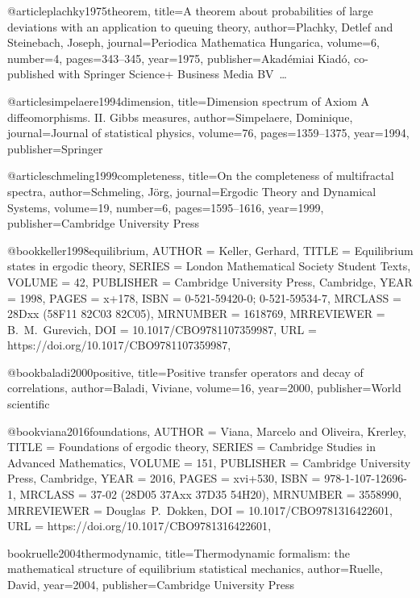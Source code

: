 @article{plachky1975theorem,
  title={A theorem about probabilities of large deviations with an application to queuing theory},
  author={Plachky, Detlef and Steinebach, Joseph},
  journal={Periodica Mathematica Hungarica},
  volume={6},
  number={4},
  pages={343--345},
  year={1975},
  publisher={Akad{\'e}miai Kiad{\'o}, co-published with Springer Science+ Business Media BV~…}
}

@article{simpelaere1994dimension,
  title={Dimension spectrum of Axiom A diffeomorphisms. II. Gibbs measures},
  author={Simpelaere, Dominique},
  journal={Journal of statistical physics},
  volume={76},
  pages={1359--1375},
  year={1994},
  publisher={Springer}
}

@article{schmeling1999completeness,
  title={On the completeness of multifractal spectra},
  author={Schmeling, J{\"o}rg},
  journal={Ergodic Theory and Dynamical Systems},
  volume={19},
  number={6},
  pages={1595--1616},
  year={1999},
  publisher={Cambridge University Press}
}

@book{keller1998equilibrium,
    AUTHOR = {Keller, Gerhard},
     TITLE = {Equilibrium states in ergodic theory},
    SERIES = {London Mathematical Society Student Texts},
    VOLUME = {42},
 PUBLISHER = {Cambridge University Press, Cambridge},
      YEAR = {1998},
     PAGES = {x+178},
      ISBN = {0-521-59420-0; 0-521-59534-7},
   MRCLASS = {28Dxx (58F11 82C03 82C05)},
  MRNUMBER = {1618769},
MRREVIEWER = {B.\ M.\ Gurevich},
       DOI = {10.1017/CBO9781107359987},
       URL = {https://doi.org/10.1017/CBO9781107359987},
}

@book{baladi2000positive,
  title={Positive transfer operators and decay of correlations},
  author={Baladi, Viviane},
  volume={16},
  year={2000},
  publisher={World scientific}
}



@book{viana2016foundations,
    AUTHOR = {Viana, Marcelo and Oliveira, Krerley},
     TITLE = {Foundations of ergodic theory},
    SERIES = {Cambridge Studies in Advanced Mathematics},
    VOLUME = {151},
 PUBLISHER = {Cambridge University Press, Cambridge},
      YEAR = {2016},
     PAGES = {xvi+530},
      ISBN = {978-1-107-12696-1},
   MRCLASS = {37-02 (28D05 37Axx 37D35 54H20)},
  MRNUMBER = {3558990},
MRREVIEWER = {Douglas\ P.\ Dokken},
       DOI = {10.1017/CBO9781316422601},
       URL = {https://doi.org/10.1017/CBO9781316422601},
}

book{ruelle2004thermodynamic,
  title={Thermodynamic formalism: the mathematical structure of equilibrium statistical mechanics},
  author={Ruelle, David},
  year={2004},
  publisher={Cambridge University Press}
}

